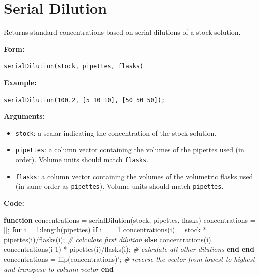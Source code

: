 \documentclass[]{tufte-book}
\newenvironment{Shaded}{}{}
\newcommand{\CommentTok}[1]{\textcolor[rgb]{0.38,0.63,0.69}{\textit{#1}}}
\newcommand{\ControlFlowTok}[1]{\textcolor[rgb]{0.00,0.44,0.13}{\textbf{#1}}}
\newcommand{\FloatTok}[1]{\textcolor[rgb]{0.25,0.63,0.44}{#1}}
\newcommand{\FunctionTok}[1]{\textcolor[rgb]{0.02,0.16,0.49}{#1}}
\newcommand{\NormalTok}[1]{#1}
\newcommand{\OperatorTok}[1]{\textcolor[rgb]{0.40,0.40,0.40}{#1}}
\begin{document}
\hypertarget{serial-dilution}{%
\section*{Serial Dilution}\label{serial-dilution}}

Returns standard concentrations based on serial dilutions of a stock solution.

\textbf{Form:}

\texttt{serialDilution(stock,\ pipettes,\ flasks)}

\textbf{Example:}

\texttt{serialDilution(100.2,\ {[}5\ 10\ 10{]},\ {[}50\ 50\ 50{]});}

\textbf{Arguments:}

\begin{itemize}
\item
  \texttt{stock}: a scalar indicating the concentration of the stock solution.
\item
  \texttt{pipettes}: a column vector containing the volumes of the pipettes used (in order). Volume units should match \texttt{flasks}.
\item
  \texttt{flasks}: a column vector containing the volumes of the volumetric flasks used (in same order as \texttt{pipettes}). Volume units should match \texttt{pipettes}.
\end{itemize}

\textbf{Code:}

\begin{Shaded}
\begin{Highlighting}[]
\ControlFlowTok{function}\NormalTok{ concentrations }\OperatorTok{=}\NormalTok{ serialDilution(stock}\OperatorTok{,}\NormalTok{ pipettes}\OperatorTok{,}\NormalTok{ flasks)}
\NormalTok{    concentrations }\OperatorTok{=}\NormalTok{[]}\OperatorTok{;}
    \ControlFlowTok{for} \FunctionTok{i} \OperatorTok{=} \FloatTok{1}\OperatorTok{:}\FunctionTok{length}\NormalTok{(pipettes)}
        \ControlFlowTok{if} \FunctionTok{i} \OperatorTok{==} \FloatTok{1}
\NormalTok{            concentrations(}\FunctionTok{i}\NormalTok{) }\OperatorTok{=}\NormalTok{ stock }\OperatorTok{*}\NormalTok{ pipettes(}\FunctionTok{i}\NormalTok{)}\OperatorTok{/}\NormalTok{flasks(}\FunctionTok{i}\NormalTok{)}\OperatorTok{;}  \CommentTok{# calculate first dilution}
        \ControlFlowTok{else}
\NormalTok{            concentrations(}\FunctionTok{i}\NormalTok{) }\OperatorTok{=}\NormalTok{ concentrations(}\FunctionTok{i}\OperatorTok{-}\FloatTok{1}\NormalTok{) }\OperatorTok{*}\NormalTok{ pipettes(}\FunctionTok{i}\NormalTok{)}\OperatorTok{/}\NormalTok{flasks(}\FunctionTok{i}\NormalTok{)}\OperatorTok{;} \CommentTok{# calculate all other dilutions}
        \ControlFlowTok{end}
    \ControlFlowTok{end}
\NormalTok{    concentrations }\OperatorTok{=} \FunctionTok{flip}\NormalTok{(concentrations)}\OperatorTok{';} \CommentTok{# reverse the vector from lowest to highest and transpose to column vector}
\ControlFlowTok{end}
\end{Highlighting}
\end{Shaded}
\end{document}
